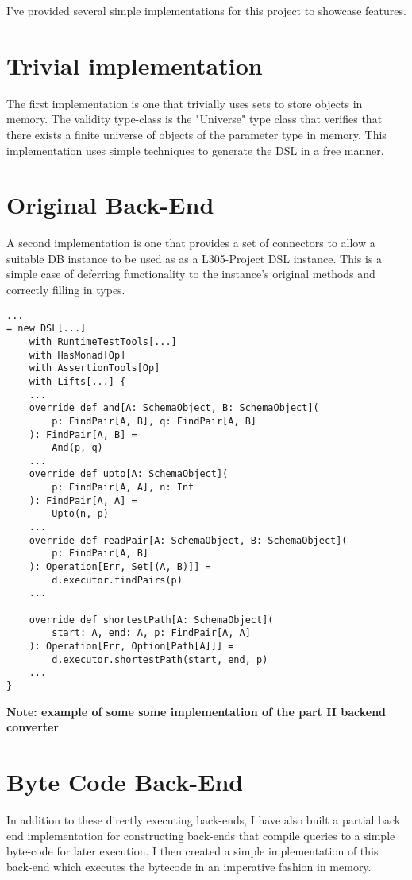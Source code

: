 \documentclass{report}
\newcommand \2[0]{\textbf{2}}
\newcommand \3[0]{\textbf{3}}
\newcommand{\todo}[1]{\textbf{#1}}
\begin{document}
I've provided several simple implementations for this project to showcase features.
\section{Trivial implementation}
The first implementation is one that trivially uses sets  to store objects in memory. The validity type-class is the "Universe" type class that verifies that there exists a finite universe of objects of the parameter type in memory. This implementation uses simple techniques to generate the DSL in a free manner.

\section{Original Back-End}
A second implementation is one that provides a set of connectors to allow a suitable DB instance to be used as as a L305-Project DSL instance. This is a simple case of deferring functionality to the instance's original methods and correctly filling in types. 

\begin{verbatim}
...
= new DSL[...]
    with RuntimeTestTools[...]
    with HasMonad[Op]
    with AssertionTools[Op]
    with Lifts[...] {
    ...
    override def and[A: SchemaObject, B: SchemaObject](
        p: FindPair[A, B], q: FindPair[A, B]
    ): FindPair[A, B] =
        And(p, q)
    ...
    override def upto[A: SchemaObject](
        p: FindPair[A, A], n: Int
    ): FindPair[A, A] =
        Upto(n, p)
    ...
    override def readPair[A: SchemaObject, B: SchemaObject](
        p: FindPair[A, B]
    ): Operation[Err, Set[(A, B)]] =
        d.executor.findPairs(p)
    ...
        
    override def shortestPath[A: SchemaObject](
        start: A, end: A, p: FindPair[A, A]
    ): Operation[Err, Option[Path[A]]] =
        d.executor.shortestPath(start, end, p)
    ...
}
\end{verbatim}
\todo{Note: example of some some implementation of the part II backend converter}

\section{Byte Code Back-End}

In addition to these directly executing back-ends, I have also built a partial back end implementation for constructing back-ends that compile queries to a simple byte-code for later execution. I then created a simple implementation of this back-end which executes the bytecode in an imperative fashion in memory.
\end{document}

